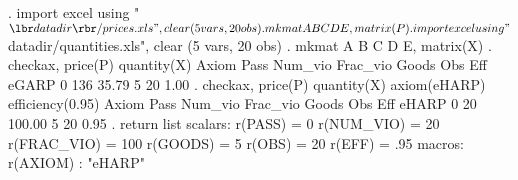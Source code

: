 . import excel using "${\lbr}datadir{\rbr}/prices.xls", clear
(5 vars, 20 obs)
{\smallskip}
. mkmat A B C D E, matrix(P)
{\smallskip}
. import excel using "${\lbr}datadir{\rbr}/quantities.xls", clear
(5 vars, 20 obs)
{\smallskip}
. mkmat A B C D E, matrix(X)
{\smallskip}
. checkax, price(P) quantity(X)
{\smallskip}
{\smallskip}
{\smallskip}
       Axiom {\VBAR} Pass     Num_vio    Frac_vio       Goods         Obs         Eff  
       eGARP {\VBAR}    0         136       35.79           5          20        1.00  
{\smallskip}
. checkax, price(P) quantity(X) axiom(eHARP) efficiency(0.95)
{\smallskip}
{\smallskip}
{\smallskip}
       Axiom {\VBAR} Pass     Num_vio    Frac_vio       Goods         Obs         Eff  
       eHARP {\VBAR}    0          20      100.00           5          20        0.95  
{\smallskip}
. return list
{\smallskip}
scalars:
               r(PASS) =  0
            r(NUM_VIO) =  20
           r(FRAC_VIO) =  100
              r(GOODS) =  5
                r(OBS) =  20
                r(EFF) =  .95
{\smallskip}
macros:
              r(AXIOM) : "eHARP"
{\smallskip}
